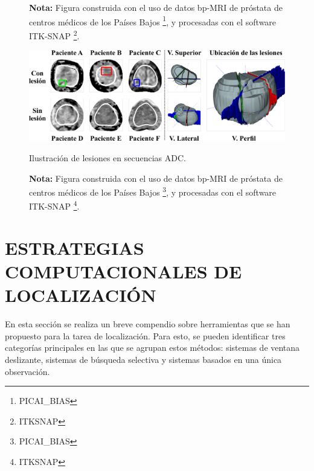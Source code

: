 \begin{figure}[h!]
\noindent \textbf{Nota:} Figura construida con el uso de datos bp-MRI de próstata de centros médicos de los Países Bajos \footnote{PICAI_BIAS}, y  procesadas con el software ITK-SNAP \footnote{ITKSNAP}.
\end{figure}



\begin{figure}[h!]
\centering
\caption{Ilustración de lesiones en secuencias ADC.}
\includegraphics[width=1\textwidth]{imgs/ADCSUMUP.png}
\label{fig:axADC}
\end{figure}

\begin{figure}[h!]
\noindent \textbf{Nota:} Figura construida con el uso de datos bp-MRI de próstata de centros médicos de los Países Bajos \footnote{PICAI_BIAS}, y  procesadas con el software ITK-SNAP \footnote{ITKSNAP}.
\end{figure}






\newpage
\section{ESTRATEGIAS COMPUTACIONALES DE LOCALIZACIÓN} \label{sec:comp_localiza}
En esta sección se realiza un breve compendio sobre herramientas que se han propuesto para la tarea de localización. 
Para esto, se pueden identificar tres categorías principales en las que se agrupan estos métodos: sistemas de ventana deslizante, sistemas de búsqueda selectiva y sistemas basados en una única observación.

